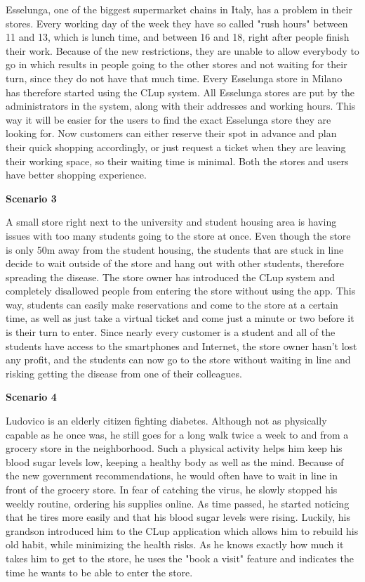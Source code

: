 \hspace{\parindent}Esselunga, one of the biggest supermarket chains in Italy, has a problem in their stores. Every working day of the week they have so called "rush hours" between 11 and 13, which is lunch time, and between 16 and 18, right after people finish their work. 
Because of the new restrictions, they are unable to allow everybody to go in which results in people going to the other stores and not waiting for their turn, since they do not have that much time. Every Esselunga store in Milano has therefore started using the CLup system. All Esselunga stores are put by the administrators in the system, along with their addresses and working hours. This way it will be easier for the users to find the exact Esselunga store they are looking for.  
Now customers can either reserve their spot in advance and plan their quick shopping accordingly, or just request a ticket when they are leaving their working space, so their waiting time is minimal. Both the stores and users have better shopping experience. \break


\textbf{Scenario 3}

\hspace{\parindent}A small store right next to the university and student housing area is having issues with too many students going to the store at once. Even though the store is only 50m away from the student housing, the students that are stuck in line decide to wait outside of the store and hang out with other students, therefore spreading the disease. The store owner has introduced the CLup system and completely disallowed people from entering the store without using the app. This way, students can easily make reservations and come to the store at a certain time, as well as just take a virtual ticket and come just a minute or two before it is their turn to enter. Since nearly every customer is a student and all of the students have access to the smartphones and Internet, the store owner hasn't lost any profit, and the students can now go to the store without waiting in line and risking getting the disease from one of their colleagues. \break

\newpage

\textbf{Scenario 4}

\hspace{\parindent}Ludovico is an elderly citizen fighting diabetes. Although not as physically capable as he once was, he still goes for a long walk twice a week to and from a grocery store in the neighborhood. Such a physical activity helps him keep his blood sugar levels low, keeping a healthy body as well as the mind. Because of the new government recommendations, he would often have to wait in line in front of the grocery store. In fear of catching the virus, he slowly stopped his weekly routine, ordering his supplies online. As time passed, he started noticing that he tires more easily and that his blood sugar levels were rising. Luckily, his grandson introduced him to the CLup application which allows him to rebuild his old habit, while minimizing the health risks. As he knows exactly how much it takes him to get to the store, he uses the "book a visit" feature and indicates the time he wants to be able to enter the store. \break

